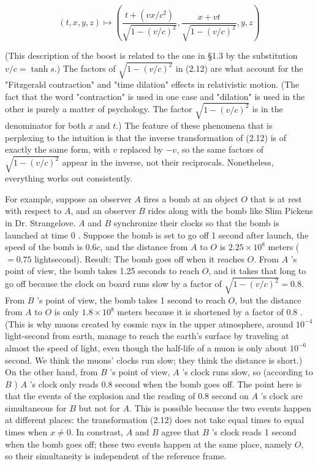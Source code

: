 \documentclass[10pt, letterpaper]{article}
\begin{document}
$$
(t, x, y, z) \mapsto\left(\frac{t+\left(v x / c^{2}\right)}{\sqrt{1-(v / c)^{2}}}, \frac{x+v t}{\sqrt{1-(v / c)^{2}}}, y, z\right)
$$

(This description of the boost is related to the one in §1.3 by the substitution $v / c=\tanh s$.) The factors of $\sqrt{1-(v / c)^{2}}$ in (2.12) are what account for the "Fitzgerald contraction" and "time dilation" effects in relativistic motion. (The fact that the word "contraction" is used in one case and "dilation" is used in the other is purely a matter of psychology. The factor $\sqrt{1-(v / c)^{2}}$ is in the denominator for both $x$ and $t$.) The feature of these phenomena that is perplexing to the intuition is that the inverse transformation of (2.12) is of exactly the same form, with $v$ replaced by $-v$, so the same factors of $\sqrt{1-(v / c)^{2}}$ appear in the inverse, not their reciprocals. Nonetheless, everything works out consistently.

For example, suppose an observer $A$ fires a bomb at an object $O$ that is at rest with respect to $A$, and an observer $B$ rides along with the bomb like Slim Pickens in Dr. Strangelove. $A$ and $B$ synchronize their clocks so that the bomb is launched at time 0 . Suppose the bomb is set to go off 1 second after launch, the speed of the bomb is $0.6 c$, and the distance from $A$ to $O$ is $2.25 \times 10^{8}$ meters ( $=0.75$ lightsecond). Result: The bomb goes off when it reaches $O$. From $A$ 's point of view, the bomb takes 1.25 seconds to reach $O$, and it takes that long to go off because the clock on board runs slow by a factor of $\sqrt{1-(v / c)^{2}}=0.8$. From $B$ 's point of view, the bomb takes 1 second to reach $O$, but the distance from $A$ to $O$ is only $1.8 \times 10^{8}$ meters because it is shortened by a factor of 0.8 . (This is why muons created by cosmic rays in the upper atmosphere, around $10^{-4}$ light-second from earth, manage to reach the earth's surface by traveling at almost the speed of light, even though the half-life of a muon is only about $10^{-6}$ second. We think the muons' clocks run slow; they think the distance is short.) On the other hand, from $B$ 's point of view, $A$ 's clock runs slow, so (according to $B$ ) $A$ 's clock only reads 0.8 second when the bomb goes off. The point here is that the events of the explosion and the reading of 0.8 second on $A$ 's clock are simultaneous for $B$ but not for $A$. This is possible because the two events happen at different places: the transformation (2.12) does not take equal times to equal times when $x \neq 0$. In constrast, $A$ and $B$ agree that $B$ 's clock reads 1 second when the bomb goes off; these two events happen at the same place, namely $O$, so their simultaneity is independent of the reference frame.
\end{document}

